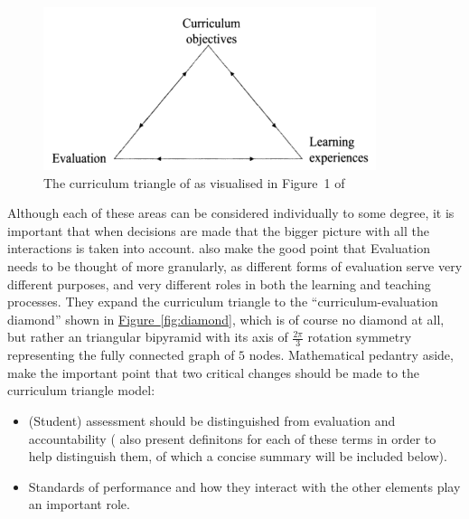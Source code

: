 \documentclass[twoside,12pt,a4paper]{report}
\newcommand{\reffig}[1]{\hyperref[fig:#1]{Figure~\ref{fig:#1}}}
\begin{document}
\begin{figure}[ht]
\centering
\includegraphics{./figures/curriculum-triangle.PNG}
\caption{The curriculum triangle of \protect{} as visualised in Figure~1 of \protect{}\label{fig:triangle}}
\end{figure}

Although each of these areas can be considered individually to some degree, it is important that when decisions are made that the bigger picture with all the interactions is taken into account.  also make the good point that Evaluation needs to be thought of more granularly, as different forms of evaluation serve very different purposes, and very different roles in both the learning and teaching processes. They expand the curriculum triangle to the ``curriculum-evaluation diamond'' shown in \reffig{diamond}, which is of course no diamond at all, but rather an triangular bipyramid with its axis of $\frac{2\pi}{3}$ rotation symmetry representing the fully connected graph of $5$ nodes. Mathematical pedantry aside,  make the important point that two critical changes should be made to the curriculum triangle model:
\begin{itemize}
	\item (Student) assessment should be distinguished from evaluation and accountability ( also present definitons for each of these terms in order to help distinguish them, of which a concise summary will be included below).
	\item Standards of performance and how they interact with the other elements play an important role.
\end{itemize}
\end{document}
